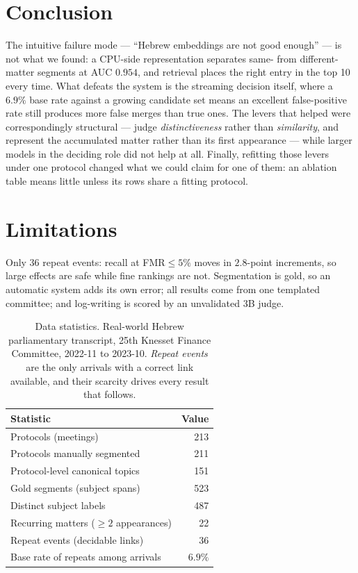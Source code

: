 \documentclass[11pt]{article}
\begin{document}
\section{Conclusion}

The intuitive failure mode --- ``Hebrew embeddings are not good enough'' --- is not what we
found: a CPU-side representation separates same- from different-matter segments at AUC
$0.954$, and retrieval places the right entry in the top 10 every time. What defeats the
system is the streaming decision itself, where a $6.9\%$ base rate against a growing
candidate set means an excellent false-positive rate still produces more false merges than
true ones. The levers that helped were correspondingly structural --- judge
\emph{distinctiveness} rather than \emph{similarity}, and represent the accumulated matter
rather than its first appearance --- while larger models in the deciding role did not help at
all. Finally, refitting those levers under one protocol changed what we could claim for one
of them: an ablation table means little unless its rows share a fitting protocol.

\section*{Limitations}

Only 36 repeat events: recall at FMR$\le5\%$ moves in $2.8$-point increments, so large
effects are safe while fine rankings are not. Segmentation is gold, so an automatic system
adds its own error; all results come from one templated committee; and log-writing is scored
by an unvalidated 3B judge.

\clearpage


\begin{table}[t]
\centering\small
\begin{tabular}{lr}
\hline
\textbf{Statistic} & \textbf{Value} \\
\hline
Protocols (meetings) & 213 \\
Protocols manually segmented & 211 \\
Protocol-level canonical topics & 151 \\
Gold segments (subject spans) & 523 \\
Distinct subject labels & 487 \\
Recurring matters ($\ge 2$ appearances) & 22 \\
Repeat events (decidable links) & 36 \\
Base rate of repeats among arrivals & $6.9\%$ \\
\hline
\end{tabular}
\caption{Data statistics. Real-world Hebrew parliamentary transcript, 25th Knesset Finance
Committee, 2022-11 to 2023-10. \emph{Repeat events} are the only arrivals with a correct
link available, and their scarcity drives every result that follows.}
\label{tab:data}
\end{table}
\end{document}
